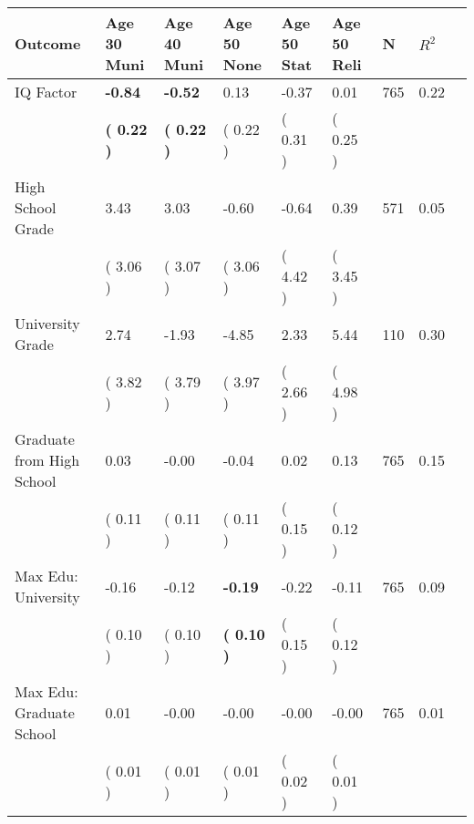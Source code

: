\begin{tabular}{L{6.2cm} C{1.8cm} C{1.8cm} C{1.8cm} C{1.8cm} C{1.8cm} C{1.8cm} C{0.3cm} C{0.3cm}}
\toprule
 \textbf{Outcome} & \textbf{Age 30 Muni} & \textbf{Age 40 Muni} & \textbf{Age 50 None} & \textbf{Age 50 Stat} & \textbf{Age 50 Reli} & \textbf{N} & \textbf{$ R^2$} \\
\midrule
IQ Factor & \textbf{    -0.84} & \textbf{    -0.52} &      0.13 &     -0.37 &      0.01  & 765 &       0.22 \\ 
 & \textbf{(     0.22 )} & \textbf{(     0.22 )} & (     0.22 ) & (     0.31 ) & (     0.25 )  & \\
High School Grade &      3.43 &      3.03 &     -0.60 &     -0.64 &      0.39  & 571 &       0.05 \\ 
 & (     3.06 ) & (     3.07 ) & (     3.06 ) & (     4.42 ) & (     3.45 )  & \\
University Grade &      2.74 &     -1.93 &     -4.85 &      2.33 &      5.44  & 110 &       0.30 \\ 
 & (     3.82 ) & (     3.79 ) & (     3.97 ) & (     2.66 ) & (     4.98 )  & \\
Graduate from High School &      0.03 &     -0.00 &     -0.04 &      0.02 &      0.13  & 765 &       0.15 \\ 
 & (     0.11 ) & (     0.11 ) & (     0.11 ) & (     0.15 ) & (     0.12 )  & \\
Max Edu: University &     -0.16 &     -0.12 & \textbf{    -0.19} &     -0.22 &     -0.11  & 765 &       0.09 \\ 
 & (     0.10 ) & (     0.10 ) & \textbf{(     0.10 )} & (     0.15 ) & (     0.12 )  & \\
Max Edu: Graduate School &      0.01 &     -0.00 &     -0.00 &     -0.00 &     -0.00  & 765 &       0.01 \\ 
 & (     0.01 ) & (     0.01 ) & (     0.01 ) & (     0.02 ) & (     0.01 )  & \\
\bottomrule
\end{tabular}
